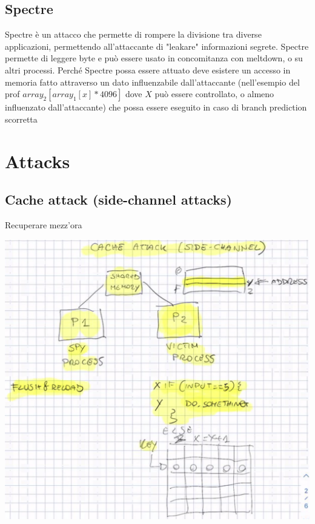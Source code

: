 \documentclass[11pt, oneside]{article}   	%
\begin{document}
\subsection*{Spectre}
Spectre è un attacco che permette di rompere la divisione tra diverse applicazioni, permettendo all'attaccante di "leakare" informazioni segrete.
Spectre permette di leggere byte e può essere usato in concomitanza con meltdown, o su altri processi. Perché Spectre possa essere attuato deve esistere un accesso in memoria fatto attraverso un dato influenzabile dall'attaccante (nell'esempio del prof $array_2[array_1[x] * 4096]$ dove $X$ può essere controllato, o almeno influenzato dall'attaccante) che possa essere eseguito in caso di branch prediction scorretta



\section*{Attacks}
\subsection*{Cache attack (side-channel attacks)}
Recuperare mezz'ora
\begin{center}
\includegraphics[scale = 0.4]{at}
\end{center}
\end{document}
